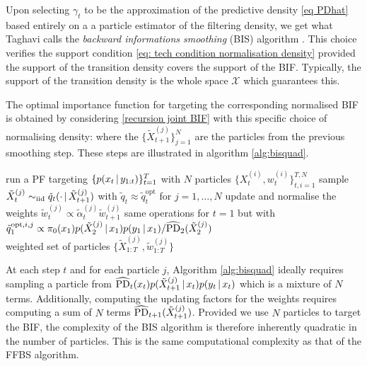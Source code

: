 Upon selecting $\gamma_{t}$ to be the approximation of the predictive density \eqref{eq PDhat} based entirely on a a particle estimator of the filtering density, we get what Taghavi calls the \emph{backward informations smoothing} (BIS) algorithm \citet{taghavi12}. This choice verifies the support condition \eqref{eq: tech condition normalisation density} provided the support  of the transition density covers the support of the BIF. Typically, the support of the transition density is the whole space $\mathcal X$ which guarantees this.

The optimal importance function for targeting the corresponding normalised BIF is obtained by considering \eqref{recursion joint BIF} with this specific choice of normalising density:
where the $\{\tilde X_{t+1}^{(j)}\}_{j=1}^{N}$ are the particles from the previous smoothing step. These steps are illustrated in algorithm \ref{alg:bisquad}.

%
\begin{algorithm}[!h]\small
	\caption{\label{alg:bisquad}}
	\begin{algorithmic}[1]
		\State run a PF targeting $\{p(x_{t}\,|\, y_{1:t})\}_{t=1}^{T}$ with $N$ particles $\{X^{(i)}_{t}, w^{(i)}_{t}\}_{t,i=1}^{T,N}$
			\State sample $\tilde X^{(j)}_{t}\sim_{\mathrm{iid}} \tilde q_{t}(\cdot\,|\, \tilde X^{(j)}_{t+1})$ with $\tilde q_{t}\approx \tilde q_{t}^{\text{opt}}$ for $j=1,\dots,N$
			\State update and normalise the weights $\tilde w^{(j)}_{t}\propto \tilde\alpha^{(j)}_{t}\tilde w^{(j)}_{t+1}$
		\EndFor
		\State same operations for $t=1$ but with $\tilde q^{\text{opt},i,j}_{1} \propto \pi_{0}(x_{1})p(\tilde X^{(j)}_{2}\,|\, x_{1})p(y_{1}\,|\, x_{1})/\widehat{\text{PD}}_{2}(\tilde X^{(j)}_{2})$\\

		\Return weighted set of particles $\{\tilde X^{(j)}_{1:T}, \tilde w^{(j)}_{1:T}\}$
	\end{algorithmic}
\end{algorithm}
%

At each step $t$ and for each particle $j$, Algorithm \ref{alg:bisquad} ideally requires sampling a particle from $\widehat{\text{PD}}_{t}(x_{t})p(\tilde X^{(j)}_{t+1}\,|\, x_{t})p(y_{t}\,|\, x_{t})$ which is a mixture of $N$ terms. Additionally, computing the updating factors for the weights requires computing a sum of $N$ terms $\widehat{\text{PD}}_{t+1}(\tilde X_{t+1}^{(j)})$. Provided we use $N$ particles to target the BIF, the complexity of the BIS algorithm is therefore inherently quadratic in the number of particles. This is the same computational complexity as that of the FFBS algorithm.

